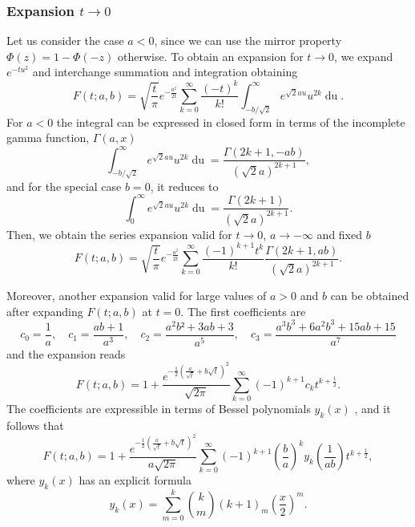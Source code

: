 \documentclass[10pt,a4paper,oneside]{article}
\numberwithin{equation}{section}
\begin{document}
\subsubsection{Expansion $t \to 0$}

Let us consider the case $a < 0$, since we can use the mirror property $\Phi(z) = 1 - \Phi(-z)$ otherwise. To obtain an expansion for $t \to 0$, we expand $e^{-tu^2}$ and interchange summation and integration obtaining
\begin{equation*}
F(t; a, b) = \sqrt{\frac{t}{\pi}} e^{-\frac{a^2}{2t}} \sum_{k=0}^{\infty} \frac{(-t)^k}{k!}\int_{-b/\sqrt{2}}^{\infty} e^{\sqrt{2}a u} u^{2k}\mathop{du}.
\end{equation*}
For $a < 0$ the integral can be expressed in closed form in terms of the incomplete gamma function, $\Gamma(a, x)$
\begin{equation*}
\int_{-b/\sqrt{2}}^{\infty} e^{\sqrt{2}a u} u^{2k}\mathop{du} = \frac{\Gamma(2k+1, -ab)}{(\sqrt{2}a)^{2k+1}},
\end{equation*}
and for the special case $b=0$, it reduces to
\begin{equation*}
\int_{0}^{\infty} e^{\sqrt{2}a u} u^{2k}\mathop{du} = \frac{\Gamma(2k+1)}{(\sqrt{2}a)^{2k+1}}.
\end{equation*}
Then, we obtain the series expansion valid for $t \to 0$, $a \to -\infty$ and fixed $b$
\begin{equation}
F(t; a, b) = \sqrt{\frac{t}{\pi}} e^{-\frac{a^2}{2t}} \sum_{k=0}^{\infty} \frac{(-1)^{k+1} t^k}{k!}\frac{\Gamma(2k + 1, ab)}{(\sqrt{2}a)^{2k+1}}.
\end{equation}

Moreover, another expansion valid for large values of $a > 0$ and $b$ can be obtained after expanding $F(t;a,b)$ at $t=0$. The first coefficients are
\begin{equation}
c_0 = \frac{1}{a}, \quad c_1 = \frac{ab + 1}{a^3}, \quad c_2 = \frac{a^2b² +3ab + 3}{a^5}, \quad c_3 = \frac{a^3b^3 + 6a^2b^3 + 15ab + 15}{a^7}
\end{equation}
and the expansion reads
\begin{equation}
F(t; a, b) = 1 + \frac{e^{-\frac{1}{2} \left(\frac{a}{\sqrt{t}} + b\sqrt{t} \right)^2}}{\sqrt{2\pi}}\sum_{k=0}^{\infty}(-1)^{k+1}c_k t^{k + \frac{1}{2}}.
\end{equation}
The coefficients are expressible in terms of Bessel polynomials $y_k(x)$ \cite[\S A001498]{OEIS}, and it follows that
\begin{equation}
F(t; a, b) = 1 + \frac{e^{-\frac{1}{2} \left(\frac{a}{\sqrt{t}} + b\sqrt{t} \right)^2}}{a\sqrt{2\pi}}\sum_{k=0}^{\infty}(-1)^{k+1} \left(\frac{b}{a}\right)^k y_k\left(\frac{1}{ab}\right) t^{k + \frac{1}{2}},
\end{equation}
where $y_k(x)$ has an explicit formula
\begin{equation}
y_k(x) = \sum_{m=0}^k \binom{k}{m} (k + 1)_m \left(\frac{x}{2}\right)^m.
\end{equation}
\end{document}
